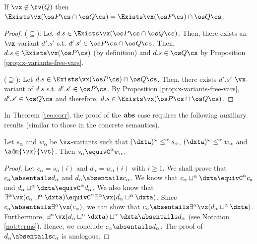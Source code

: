 \documentclass{tlp}
\begin{document}
\begin{proposition} \label{prop:den-se-ext}
If $\vx \not\in \fv(Q)$ then $\Exists \vx (\os P\cs \cap \os Q\cs) = \Exists \vx(\os P\cs) \cap \os Q\cs$.
\end{proposition}
\begin{proof}
\noindent ($\subseteq$): Let $d.s \in \Exists \vx (\os P\cs \cap \os Q\cs)$. Then, there exists an $\vx$-variant $d'.s'$ s.t. $d'.s' \in \os P \cs \cap \os Q\cs$. Then, $d.s \in \Exists \vx (\os P\cs)$ (by definition) and $d.s \in \os Q \cs$ by Proposition \ref{prop:x-variants-free-vars}.

\noindent ($\supseteq$): Let $d.s \in \Exists \vx(\os P\cs) \cap \os Q\cs$.  Then, there exists $d'.s'$ $\vx$-variant of $d.s$ s.t. $d'.s' \in \os P \cs$. By Proposition \ref{prop:x-variants-free-vars}, 
$d'.s' \in \os Q \cs$ and therefore, $d.s \in \Exists \vx (\os P \cs \cap \os Q \cs)$. 
\end{proof}





In Theorem \ref{teo:corr}, the proof of the ${\bf abs }$   case  requires the following auxiliary results (similar to those in the concrete semantics). 

   \begin{observation}\label{l-vx-eq-abs}
Let $s_\alpha$ and $w_\alpha$ be $\vx$-variants such that $({\dxta})^{\omega} \leq^\alpha s_\alpha$,  $({\dxta})^{\omega} \leq^\alpha w_\alpha$  and $\adm{\vx}{\vt}$. Then $s_\alpha\equivC^\alpha w_\alpha$.
\end{observation}
\begin{proof}
Let $c_\alpha=s_\alpha(i)$ and $d_\alpha=w_\alpha(i)$ with $i\geq1$. We shall prove that $c_\alpha\absentails d_\alpha$ and $d_\alpha \absentails c_\alpha$.  We know that  
$c_\alpha \sqcup^\alpha \dxta \equivC^\alpha c_a$ and $d_\alpha \sqcup^\alpha \dxta \equivC^\alpha d_\alpha$. We also know that 
$\exists^\alpha \vx (c_\alpha\sqcup^\alpha \dxta) \equivC^\alpha \exists^\alpha \vx (d_\alpha\sqcup^\alpha \dxta)$. Since $c_\alpha \absentails \exists^\alpha \vx( c_\alpha)$, 
we can  show that 
$c_\alpha \absentails \exists^\alpha \vx(d_\alpha \sqcup^\alpha \dxta)$.
Furthermore, 
$\exists^\alpha \vx(d_\alpha \sqcup^\alpha \dxta)\sqcup^\alpha \dxta \absentails d_\alpha$ (see Notation \ref{not:terms}). 
Hence, we conclude 
$c_\alpha \absentails d_\alpha$. The proof of $d_\alpha\absentails c_\alpha$ is analogous. 
\end{proof}
\end{document}
